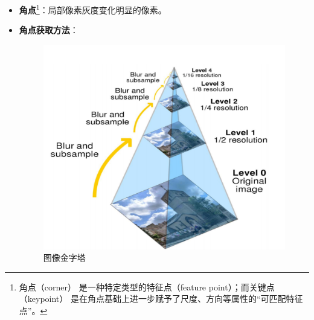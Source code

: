 \documentclass[../main.tex]{subfiles}
\begin{document}
\begin{enumerate}
\begin{itemize}
\begin{enumerate}
\begin{itemize}
\begin{itemize}
                                        \begin{itemize}
                                            \item \textbf{角点}\footnote{角点（corner） 是一种特定类型的特征点（feature point）；而关键点（keypoint） 是在角点基础上进一步赋予了尺度、方向等属性的“可匹配特征点”。}：局部像素灰度变化明显的像素。
                                            \item \textbf{角点获取方法}：
                                                \begin{figure}[H]
                                                    \centering
                                                    \begin{minipage}[t]{0.35\textwidth}
                                                        \centering
                                                        \includegraphics[width=\textwidth]{images/orb2.png}
                                                        \caption{图像金字塔}
                                                        \label{fig:orb_pyramid}
                                                    \end{minipage}
                                                    \begin{minipage}[t]{0.35\textwidth}
                                                        \centering

\end{minipage}
\end{figure}
\end{itemize}
\end{itemize}
\end{itemize}
\end{enumerate}
\end{itemize}
\end{enumerate}
\end{document}
